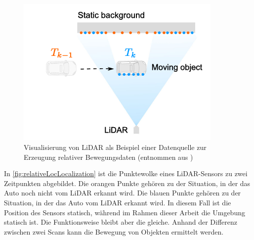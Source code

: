 \begin{figure}[H]
    \centering
    \includegraphics[width=10cm]{graphics/localization.png}
    \caption{Visualisierung von LiDAR als Beispiel einer Datenquelle zur Erzeugung relativer Bewegungsdaten (entnommen aus \cite{Wu.2024})}
    \label{fig:relativeLocLocalization}
\end{figure}
In \autoref{fig:relativeLocLocalization} ist die Punktewolke eines LiDAR-Sensors zu zwei Zeitpunkten abgebildet. 
Die orangen Punkte gehören zu der Situation, in der das Auto noch nicht vom LiDAR erkannt wird.
Die blauen Punkte gehören zu der Situation, in der das Auto vom LiDAR erkannt wird. 
In diesem Fall ist die Position des Sensors statisch, während im Rahmen dieser Arbeit die Umgebung statisch ist.
Die Funktionsweise bleibt aber die gleiche. 
Anhand der Differenz zwischen zwei Scans kann die Bewegung von Objekten ermittelt werden.

